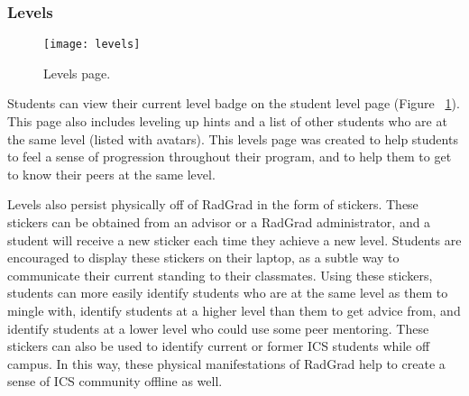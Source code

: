 \subsubsection{Levels}

\begin{figure}[htbp!]
\centering
\texttt{[image: levels]}
\caption{Levels page.}
\label{levels}
\end{figure}

Students can view their current level badge on the student level page (Figure ~\ref{levels}). This page also includes leveling up hints and a list of other students who are at the same level (listed with avatars). This levels page was created to help students to feel a sense of progression throughout their program, and to help them to get to know their peers at the same level.

Levels also persist physically off of RadGrad in the form of stickers. These stickers can be obtained from an advisor or a RadGrad administrator, and a student will receive a new sticker each time they achieve a new level. Students are encouraged to display these stickers on their laptop, as a subtle way to communicate their current standing to their classmates. Using these stickers, students can more easily identify students who are at the same level as them to mingle with, identify students at a higher level than them to get advice from, and identify students at a lower level who could use some peer mentoring. These stickers can also be used to identify current or former ICS students while off campus. In this way, these physical manifestations of RadGrad help to create a sense of ICS community offline as well. 

